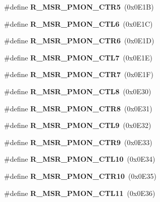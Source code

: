\begin{DoxyCompactItemize}
\item 
\#define {\bfseries R\+\_\+\+M\+S\+R\+\_\+\+P\+M\+O\+N\+\_\+\+C\+T\+R5}~(0x0\+E1\+B)\label{types_8h_a9a14e26164ee41a8d3976b1fbc71607f}

\item 
\#define {\bfseries R\+\_\+\+M\+S\+R\+\_\+\+P\+M\+O\+N\+\_\+\+C\+T\+L6}~(0x0\+E1\+C)\label{types_8h_a68cc99e6775534a5cb0ecedf899a6603}

\item 
\#define {\bfseries R\+\_\+\+M\+S\+R\+\_\+\+P\+M\+O\+N\+\_\+\+C\+T\+R6}~(0x0\+E1\+D)\label{types_8h_a0bc6e0e035540942d0389ad21f4a410f}

\item 
\#define {\bfseries R\+\_\+\+M\+S\+R\+\_\+\+P\+M\+O\+N\+\_\+\+C\+T\+L7}~(0x0\+E1\+E)\label{types_8h_a3b7d38eb7ebbc05767c7529b58e5b88d}

\item 
\#define {\bfseries R\+\_\+\+M\+S\+R\+\_\+\+P\+M\+O\+N\+\_\+\+C\+T\+R7}~(0x0\+E1\+F)\label{types_8h_acb45653fb69da0436db21244ed0bb483}

\item 
\#define {\bfseries R\+\_\+\+M\+S\+R\+\_\+\+P\+M\+O\+N\+\_\+\+C\+T\+L8}~(0x0\+E30)\label{types_8h_a05ca8d6b245c3a6cb0d3681cdc38714c}

\item 
\#define {\bfseries R\+\_\+\+M\+S\+R\+\_\+\+P\+M\+O\+N\+\_\+\+C\+T\+R8}~(0x0\+E31)\label{types_8h_a7a4e1a1332f20698b0fd8a6eeb85dfd8}

\item 
\#define {\bfseries R\+\_\+\+M\+S\+R\+\_\+\+P\+M\+O\+N\+\_\+\+C\+T\+L9}~(0x0\+E32)\label{types_8h_a87db7f30713c117648fd0c3a592d9e92}

\item 
\#define {\bfseries R\+\_\+\+M\+S\+R\+\_\+\+P\+M\+O\+N\+\_\+\+C\+T\+R9}~(0x0\+E33)\label{types_8h_af7f2703451a13e9ad20f39e17241d38c}

\item 
\#define {\bfseries R\+\_\+\+M\+S\+R\+\_\+\+P\+M\+O\+N\+\_\+\+C\+T\+L10}~(0x0\+E34)\label{types_8h_ab157e96921e6d2d790262bbc56bf82fc}

\item 
\#define {\bfseries R\+\_\+\+M\+S\+R\+\_\+\+P\+M\+O\+N\+\_\+\+C\+T\+R10}~(0x0\+E35)\label{types_8h_a2b202210a0ccfaf0130499510b5e7215}

\item 
\#define {\bfseries R\+\_\+\+M\+S\+R\+\_\+\+P\+M\+O\+N\+\_\+\+C\+T\+L11}~(0x0\+E36)\label{types_8h_a7bff73fd6b4901add6b2c57a72031dbc}


\end{DoxyCompactItemize}
